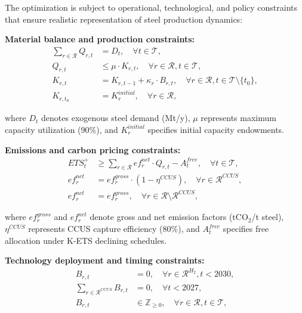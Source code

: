 \documentclass[preprint,5p,authoryear]{elsarticle}
\begin{document}
The optimization is subject to operational, technological, and policy constraints that ensure realistic representation of steel production dynamics:

\textbf{Material balance and production constraints:}
\begin{align}
\sum_{r \in \mathcal{R}} Q_{r,t} &= D_t, \quad \forall t \in \mathcal{T}, \label{eq:demand}\\
Q_{r,t} &\le \mu \cdot K_{r,t}, \quad \forall r \in \mathcal{R}, t \in \mathcal{T}, \label{eq:utilization}\\
K_{r,t} &= K_{r,t-1} + \kappa_r \cdot B_{r,t}, \quad \forall r \in \mathcal{R}, t \in \mathcal{T} \setminus \{t_0\}, \label{eq:capacity}\\
K_{r,t_0} &= K_r^{initial}, \quad \forall r \in \mathcal{R}, \label{eq:initial}
\end{align}

where $D_t$ denotes exogenous steel demand (Mt/y), $\mu$ represents maximum capacity utilization (90\%), and $K_r^{initial}$ specifies initial capacity endowments.

\textbf{Emissions and carbon pricing constraints:}
\begin{align}
ETS_t^+ &\ge \sum_{r \in \mathcal{R}} ef_r^{net} \cdot Q_{r,t} - A_t^{free}, \quad \forall t \in \mathcal{T}, \label{eq:ets_balance}\\
ef_r^{net} &= ef_r^{gross} \cdot (1 - \eta^{CCUS}), \quad \forall r \in \mathcal{R}^{CCUS}, \label{eq:ccus_factor}\\
ef_r^{net} &= ef_r^{gross}, \quad \forall r \in \mathcal{R} \setminus \mathcal{R}^{CCUS}, \label{eq:no_ccus}
\end{align}

where $ef_r^{gross}$ and $ef_r^{net}$ denote gross and net emission factors (tCO$_2$/t steel), $\eta^{CCUS}$ represents CCUS capture efficiency (80\%), and $A_t^{free}$ specifies free allocation under K-ETS declining schedules.

\textbf{Technology deployment and timing constraints:}
\begin{align}
B_{r,t} &= 0, \quad \forall r \in \mathcal{R}^{H_2}, t < 2030, \label{eq:h2_timing}\\
\sum_{r \in \mathcal{R}^{CCUS}} B_{r,t} &= 0, \quad \forall t < 2027, \label{eq:ccus_timing}\\
B_{r,t} &\in \mathbb{Z}_{\ge 0}, \quad \forall r \in \mathcal{R}, t \in \mathcal{T}, \label{eq:integer}
\end{align}
\end{document}
